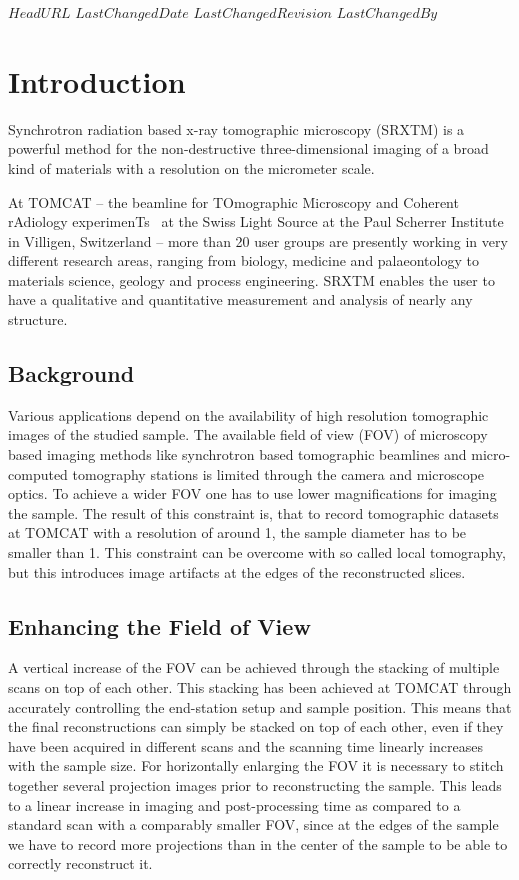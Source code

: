 \svnidlong
{$HeadURL$}
{$LastChangedDate$}
{$LastChangedRevision$}
{$LastChangedBy$}
\section{Introduction}

Synchrotron radiation based x-ray tomographic microscopy (SRXTM) is a powerful method for the non-destructive three-dimensional imaging of a broad kind of materials with a resolution on the micrometer scale.

At TOMCAT -- the beamline for TOmographic Microscopy and Coherent rAdiology experimenTs~\cite{Stampanoni2007} at the Swiss Light Source at the Paul Scherrer Institute in Villigen, Switzerland -- more than 20 user groups are presently working in very different research areas, ranging from biology, medicine and palaeontology to materials science, geology and process engineering. SRXTM enables the user to have a qualitative and quantitative measurement and analysis of nearly any structure.

\subsection{Background}
Various applications depend on the availability of high resolution tomographic images of the studied sample. The available field of view (FOV) of microscopy based imaging methods like synchrotron based tomographic beamlines and micro-computed tomography stations is limited through the camera and microscope optics. To achieve a wider FOV one has to use lower magnifications for imaging the sample. The result of this constraint is, that to record tomographic datasets at TOMCAT with a resolution of around \unit{1}{\micro\meter}, the sample diameter has to be smaller than \unit{1}{\milli\meter}. This constraint can be overcome with so called local tomography, but this introduces image artifacts at the edges of the reconstructed slices.

\subsection{Enhancing the Field of View}
A vertical increase of the FOV can be achieved through the stacking of multiple scans on top of each other. This stacking has been achieved at TOMCAT through accurately controlling the end-station setup and sample position. This means that the final reconstructions can simply be stacked on top of each other, even if they have been acquired in different scans and the scanning time linearly increases with the sample size. For horizontally enlarging the FOV it is necessary to stitch together several projection images prior to reconstructing the sample. This leads to a linear increase in imaging and post-processing time as compared to a standard scan with a comparably smaller FOV, since at the edges of the sample we have to record more projections than in the center of the sample to be able to correctly reconstruct it. 